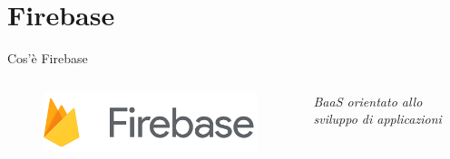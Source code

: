 \documentclass{../libs/presentation_format}
\begin{document}

\section{Firebase}
\begin{frame}{Cos'è Firebase}
	\begin{minipage}[0.2\textheight]{\textwidth}
		\begin{columns}[T]
			\begin{column}{0.4\textwidth}
				\begin{figure}[htpb]
					\centering
					\includegraphics[scale=0.18]{../libs/firebase-logo}
				\end{figure}
			\end{column}
			\begin{column}{0.6\textwidth}
				\emph{BaaS orientato allo sviluppo di applicazioni}
			\end{column}
		\end{columns}
	\end{minipage}
\end{frame}

\end{document}
